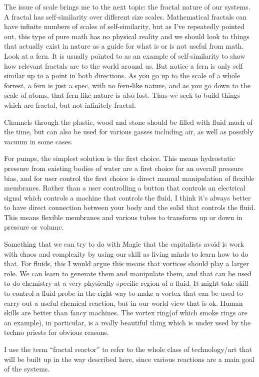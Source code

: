 The issue of scale brings me to the next topic: the fractal nature of
our systems. A fractal has self-similarity over different size scales.
Mathematical fractals can have infinite numbers of scales of
self-similarity, but as I've repeatedly pointed out, this type of pure
math has no physical reality and we should look to things that actually
exist in nature as a guide for what is or is not useful from math. Look
at a fern. It is usually pointed to as an example of self-similarity to
show how relevant fractals are to the world around us. But notice a fern
is only self similar up to a point in both directions. As you go up to
the scale of a whole forrest, a fern is just a spec, with no fern-like
nature, and as you go down to the scale of atoms, that fern-like nature
is also lost. Thus we seek to build things which are fractal, but not
infinitely fractal.

Channels through the plastic, wood and stone should be filled with fluid
much of the time, but can also be used for various gasses including air,
as well as possibly vacuum in some cases.

For pumps, the simplest solution is the first choice. This means
hydrostatic pressure from existing bodies of water are a first choice
for an overall pressure bias, and for user control the first choice is
direct manual manipulation of flexible membranes. Rather than a user
controlling a button that controls an electrical signal which controls a
machine that controls the fluid, I think it's always better to have
direct connection between your body and the solid that controls the
fluid. This means flexible membranes and various tubes to transform up
or down in pressure or volume.

Something that we can try to do with Magic that the capitalists avoid is
work with chaos and complexity by using our skill as living minds to
learn how to do that. For fluids, this I would argue this means that
vortices should play a larger role. We can learn to generate them and
manipulate them, and that can be used to do chemistry at a very
physically specific region of a fluid. It might take skill to control a
fluid probe in the right way to make a vortex that can be used to carry
out a useful chemical reaction, but in our world view that is ok. Human
skills are better than fancy machines. The vortex ring(of which smoke
rings are an example), in particular, is a really beautiful thing which
is under used by the techno priests for obvious reasons.

I use the term ``fractal reactor'' to refer to the whole class of
technology/art that will be built up in the way described here, since
various reactions are a main goal of the systems.

